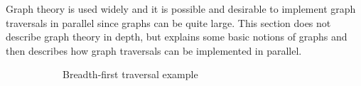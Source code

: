 Graph theory is used widely and it is possible and desirable to implement graph traversals in parallel since graphs can be quite large.
This section does not describe graph theory in depth, but explains some basic notions of graphs and then describes how graph traversals can be implemented in parallel.
\begin{figure}
	\begin{subfigure}[b]{0.3\textwidth}
		\begin{center}
		\end{center}
		\caption{Breadth-first traversal example}
		\label{fig:bfs}
	\end{subfigure}	
	\begin{subfigure}[b]{0.3\textwidth}
		\begin{center}
\end{center}
\end{subfigure}
\end{figure}
